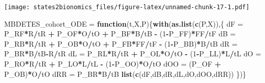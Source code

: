 \documentclass[]{article}
\newenvironment{Shaded}{\begin{snugshade}}{\end{snugshade}}
\newcommand{\ControlFlowTok}[1]{\textcolor[rgb]{0.13,0.29,0.53}{\textbf{#1}}}
\newcommand{\DecValTok}[1]{\textcolor[rgb]{0.00,0.00,0.81}{#1}}
\newcommand{\KeywordTok}[1]{\textcolor[rgb]{0.13,0.29,0.53}{\textbf{#1}}}
\newcommand{\NormalTok}[1]{#1}
\newcommand{\OperatorTok}[1]{\textcolor[rgb]{0.81,0.36,0.00}{\textbf{#1}}}
\newcommand{\StringTok}[1]{\textcolor[rgb]{0.31,0.60,0.02}{#1}}
\begin{document}
\texttt{[image: states2bionomics\_files/figure-latex/unnamed-chunk-17-1.pdf]}

\begin{Shaded}
\begin{Highlighting}[]
\NormalTok{MBDETES_cohort_ODE =}\StringTok{ }\ControlFlowTok{function}\NormalTok{(t,X,P)\{}\KeywordTok{with}\NormalTok{(}\KeywordTok{as.list}\NormalTok{(}\KeywordTok{c}\NormalTok{(P,X)),\{}
\NormalTok{  dF =}\StringTok{ }\NormalTok{P_RF}\OperatorTok{*}\NormalTok{R}\OperatorTok{/}\NormalTok{tR }\OperatorTok{+}\StringTok{ }\NormalTok{P_OF}\OperatorTok{*}\NormalTok{O}\OperatorTok{/}\NormalTok{tO }\OperatorTok{+}\StringTok{ }\NormalTok{P_BF}\OperatorTok{*}\NormalTok{B}\OperatorTok{/}\NormalTok{tB }\OperatorTok{-}\StringTok{ }\NormalTok{(}\DecValTok{1}\OperatorTok{-}\NormalTok{P_FF)}\OperatorTok{*}\NormalTok{FF}\OperatorTok{/}\NormalTok{tF}
\NormalTok{  dB =}\StringTok{ }\NormalTok{P_RB}\OperatorTok{*}\NormalTok{R}\OperatorTok{/}\NormalTok{tR }\OperatorTok{+}\StringTok{ }\NormalTok{P_OB}\OperatorTok{*}\NormalTok{O}\OperatorTok{/}\NormalTok{tO }\OperatorTok{+}\StringTok{ }\NormalTok{P_FB}\OperatorTok{*}\NormalTok{FF}\OperatorTok{/}\NormalTok{tF }\OperatorTok{-}\StringTok{ }\NormalTok{(}\DecValTok{1}\OperatorTok{-}\NormalTok{P_BB)}\OperatorTok{*}\NormalTok{B}\OperatorTok{/}\NormalTok{tB}
\NormalTok{  dR =}\StringTok{ }\NormalTok{P_BR}\OperatorTok{*}\NormalTok{B}\OperatorTok{/}\NormalTok{tB}\OperatorTok{-}\NormalTok{R}\OperatorTok{/}\NormalTok{tR}
\NormalTok{  dL =}\StringTok{ }\NormalTok{P_RL}\OperatorTok{*}\NormalTok{R}\OperatorTok{/}\NormalTok{tR }\OperatorTok{+}\StringTok{ }\NormalTok{P_OL}\OperatorTok{*}\NormalTok{O}\OperatorTok{/}\NormalTok{tO }\OperatorTok{-}\StringTok{ }\NormalTok{(}\DecValTok{1}\OperatorTok{-}\NormalTok{P_LL)}\OperatorTok{*}\NormalTok{L}\OperatorTok{/}\NormalTok{tL}
\NormalTok{  dO =}\StringTok{ }\NormalTok{P_RO}\OperatorTok{*}\NormalTok{R}\OperatorTok{/}\NormalTok{tR }\OperatorTok{+}\StringTok{ }\NormalTok{P_LO}\OperatorTok{*}\NormalTok{L}\OperatorTok{/}\NormalTok{tL }\OperatorTok{-}\StringTok{ }\NormalTok{(}\DecValTok{1}\OperatorTok{-}\NormalTok{P_OO)}\OperatorTok{*}\NormalTok{O}\OperatorTok{/}\NormalTok{tO}
\NormalTok{  dOO =}\StringTok{ }\NormalTok{(P_OF }\OperatorTok{+}\StringTok{ }\NormalTok{P_OB)}\OperatorTok{*}\NormalTok{O}\OperatorTok{/}\NormalTok{tO}
\NormalTok{  dRR =}\StringTok{ }\NormalTok{P_BR}\OperatorTok{*}\NormalTok{B}\OperatorTok{/}\NormalTok{tB}
  \KeywordTok{list}\NormalTok{(}\KeywordTok{c}\NormalTok{(dF,dB,dR,dL,dO,dOO,dRR))}
\NormalTok{\})\}}


\end{Highlighting}
\end{Shaded}
\end{document}
